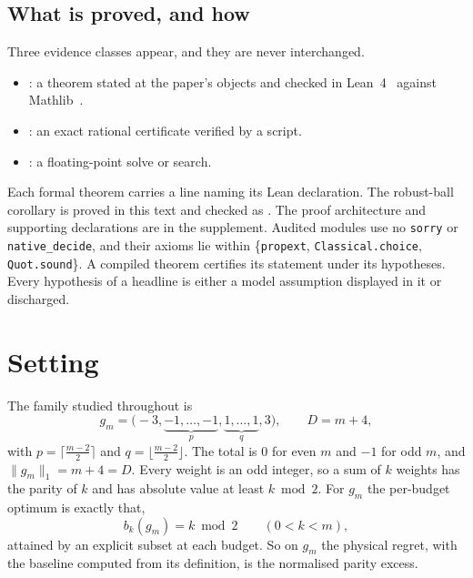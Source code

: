 \subsection{What is proved, and how}

Three evidence classes appear, and they are never interchanged.
\begin{itemize}
\item \PROVED: a theorem stated at the paper's objects and checked in
Lean~4~\cite{demoura2021} against Mathlib~\cite{mathlib2020}.
\item \CERT: an exact rational certificate verified by a script.
\item \NUM: a floating-point solve or search.
\end{itemize}
Each formal theorem carries a line naming its Lean declaration. The robust-ball corollary
is proved in this text and checked as . The proof architecture and supporting
declarations are in the supplement. Audited modules use no \texttt{sorry} or
\texttt{native\_decide}, and their axioms lie within \{\texttt{propext},
\texttt{Classical.choice}, \texttt{Quot.sound}\}. A compiled theorem certifies its statement
under its hypotheses. Every hypothesis of a headline is either a model assumption displayed
in it or discharged.

\section{Setting}
\label{sec:setting}

The family studied throughout is
\begin{equation}
g_{m}=\bigl(-3,\underbrace{-1,\dots,-1}_{p},\underbrace{1,\dots,1}_{q},3\bigr),
\qquad D=m+4,
\label{eq:family}
\end{equation}
with $p=\lceil\frac{m-2}{2}\rceil$ and $q=\lfloor\frac{m-2}{2}\rfloor$. The total is $0$ for
even $m$ and $-1$ for odd $m$, and $\|g_{m}\|_{1}=m+4=D$. Every weight is an odd integer, so
a sum of $k$ weights has the parity of $k$ and has absolute value at least $k\bmod2$. For
$g_{m}$ the per-budget optimum is exactly that,
\begin{equation}
b_{k}(g_{m})=k\bmod 2\qquad(0<k<m),
\label{eq:baseline}
\end{equation}
attained by an explicit subset at each budget. So on $g_{m}$ the physical regret, with the
baseline computed from its definition, is the normalised parity excess.


